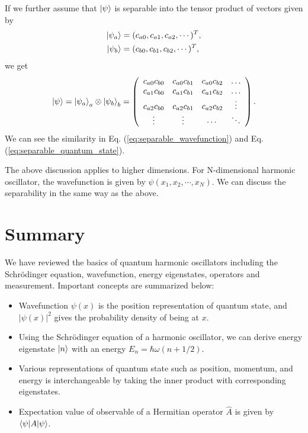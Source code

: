 If we further assume that $\ket \psi$ is separable into the tensor product of vectors given by 
\begin{equation}
\begin{aligned}
\ket {\psi_a} &= (c_{a0}, c_{a1}, c_{a2}, \cdots)^T,\\
\ket {\psi_b} &= (c_{b0}, c_{b1}, c_{b2}, \cdots)^T,
\end{aligned}
\end{equation}
we get
\begin{equation}
  \ket \psi = \ket{\psi_a}_a \otimes \ket{\psi_b}_b = \left(
  \begin{array}{cccc}
  c_{a0}c_{b0} & c_{a0}c_{b1} & c_{a0}c_{b2} & \ldots \\
  c_{a1}c_{b0} & c_{a1}c_{b1} & c_{a1}c_{b2} & \ldots \\
  c_{a2}c_{b0} & c_{a2}c_{b1} & c_{a2}c_{b2} & \vdots \\
  \vdots & \vdots & \cdots & \ddots
  \end{array}
  \right).
  \label{eq:separable_quantum_state}
\end{equation}
We can see the similarity in Eq. (\ref{eq:separable_wavefunction}) and Eq. (\ref{eq:separable_quantum_state}).


The above discussion applies to higher dimensions. For N-dimensional harmonic oscillator, the wavefunction is given by $\psi(x_1, x_2, \cdots, x_N)$. We can discuss the separability in the same way as the above. 

\section{Summary}
We have reviewed the basics of quantum harmonic oscillators including the Schr\"odinger equation, wavefunction, energy eigenstates, operators and measurement. Important concepts are summarized below:
\begin{itemize}
	\item Wavefunction $\psi(x)$ is the position representation of quantum state, and $|\psi(x)|^2$ gives the probability density of being at $x$.
	\item Using the Schr\"odinger equation of a harmonic oscillator, we can derive energy eigenstate $\ket n$ with an energy $E_n = \hbar \omega (n + 1/2)$.
	\item Various representations of quantum state such as position, momentum, and energy is interchangeable by taking the inner product with corresponding eigenstates.
	\item Expectation value of observable of a Hermitian operator $\hat A$ is given by $\braket{\psi|A|\psi}$.
\end{itemize}
